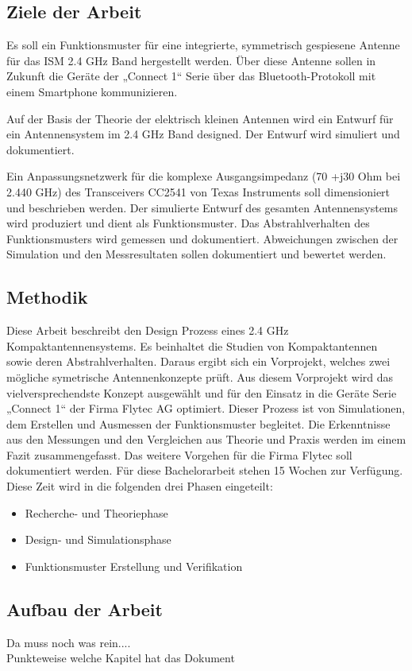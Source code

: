 \subsection{Ziele der Arbeit}
Es soll ein Funktionsmuster für eine integrierte, symmetrisch gespiesene Antenne für das ISM 2.4 GHz Band hergestellt werden. Über diese Antenne sollen in Zukunft die Geräte der „Connect 1“ Serie über das Bluetooth-Protokoll mit einem Smartphone kommunizieren. 

Auf der Basis der Theorie der elektrisch kleinen Antennen wird ein Entwurf für ein Antennensystem im 2.4 GHz Band designed. Der Entwurf wird simuliert und dokumentiert. 

Ein Anpassungsnetzwerk  für die komplexe Ausgangsimpedanz (70 +j30 Ohm bei 2.440 GHz) des Transceivers CC2541 von Texas Instruments soll dimensioniert und beschrieben werden.
Der simulierte Entwurf des gesamten Antennensystems wird produziert und dient als Funktionsmuster. Das Abstrahlverhalten des Funktionsmusters wird gemessen und dokumentiert.
Abweichungen zwischen der Simulation und den Messresultaten sollen dokumentiert und bewertet werden.
\subsection{Methodik}
Diese  Arbeit beschreibt den Design Prozess eines 2.4 GHz Kompaktantennensystems. Es beinhaltet die Studien von Kompaktantennen sowie deren Abstrahlverhalten. Daraus ergibt sich ein  Vorprojekt, welches zwei mögliche symetrische Antennenkonzepte prüft. Aus diesem Vorprojekt wird das vielversprechendste Konzept ausgewählt und für den Einsatz in die Geräte Serie „Connect 1“ der Firma Flytec AG optimiert. Dieser Prozess ist von Simulationen, dem  Erstellen und Ausmessen der Funktionsmuster begleitet. Die Erkenntnisse aus den Messungen und den Vergleichen aus Theorie und Praxis werden im einem Fazit zusammengefasst. Das weitere Vorgehen für die Firma Flytec soll dokumentiert werden. Für diese Bachelorarbeit stehen 15 Wochen zur Verfügung. Diese Zeit wird in die folgenden drei Phasen eingeteilt:
\begin{itemize}
	\item Recherche- und Theoriephase
	\item Design- und Simulationsphase 
	\item Funktionsmuster Erstellung und Verifikation
\end{itemize}

\subsection{Aufbau der Arbeit}
Da muss noch was rein....\\
Punkteweise welche Kapitel hat das Dokument





